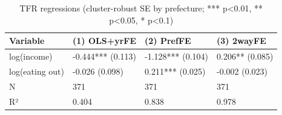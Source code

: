 \begin{table}
\caption{TFR regressions (cluster-robust SE by prefecture; *** p<0.01, ** p<0.05, * p<0.1)}
\label{tab:table1_core}
\begin{tabular}{llll}
\toprule
Variable & (1) OLS+yrFE & (2) PrefFE & (3) 2wayFE \\
\midrule
log(income) & -0.444*** (0.113) & -1.128*** (0.104) & 0.206** (0.085) \\
log(eating out) & -0.026 (0.098) & 0.211*** (0.025) & -0.002 (0.023) \\
N & 371 & 371 & 371 \\
R² & 0.404 & 0.838 & 0.978 \\
\bottomrule
\end{tabular}
\end{table}
